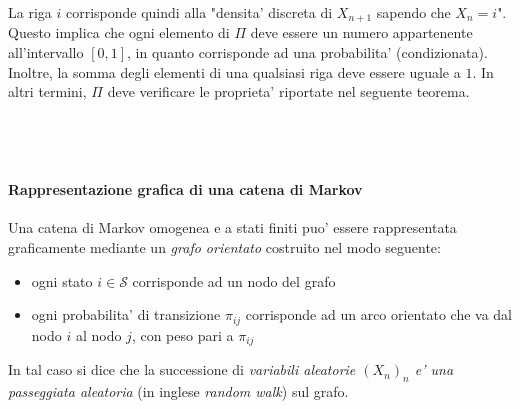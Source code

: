 \documentclass[a4paper,12pt]{article}
\begin{document}
La riga $i$ corrisponde quindi alla "densita' discreta di $X_{n+1}$ sapendo che $X_n = i$". 
Questo implica che ogni elemento di $\Pi$ deve essere un numero appartenente all’intervallo
$[0, 1]$, in quanto corrisponde ad una probabilita' (condizionata). Inoltre, la somma degli
elementi di una qualsiasi riga deve essere uguale a $1$. In altri termini, $\Pi$ deve verificare le
proprieta' riportate nel seguente teorema.\\
\vspace{1px}\\
\\
\vspace{1px}\\
\paragraph{Rappresentazione grafica di una catena di Markov} Una catena di Markov omogenea e a stati finiti puo' essere rappresentata graficamente mediante un \textit{grafo orientato} costruito nel modo seguente:
\begin{itemize}
  \item ogni stato $i \in \mathcal{S}$ corrisponde ad un nodo del grafo
  \item ogni probabilita' di transizione $\pi_{ij}$ corrisponde ad un arco orientato che va dal nodo $i$ al nodo $j$, con peso pari a $\pi_{ij}$
\end{itemize}
In tal caso si dice che la successione di \textit{variabili aleatorie $(X_n)_n$ e' una passeggiata aleatoria} (in inglese \textit{random walk}) sul grafo.
\end{document}

